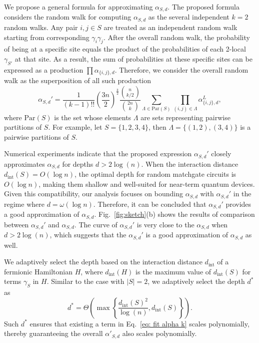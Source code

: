 \documentclass[showpacs,onecolumn,aps,prx,long bibliography,superscriptaddress,notitlepage]{revtex4-1}
\begin{document}
We propose a general formula for approximating $ \alpha_{S,d} $. The proposed formula considers the random walk for computing  $ \alpha_{S,d}$  as the several independent $k=2$ random walks. 
Any pair $i,j\in S$  are treated as an independent random walk starting from {corresponding} $\gamma_i\gamma_j$. 
After the overall random walk, the probability of being at a specific site equals the product of the probabilities of each 2-local $ \gamma_{S'} $ at that site. As a result, the sum of probabilities at these specific sites can be expressed as a production $\prod\alpha_{\{i,j\},d}$. 
Therefore, we consider the overall random walk as the superposition of all such production
\begin{equation}
    \alpha_{S,d}' = \frac{1}{(k-1)!!} \left(\frac{3n}{2}\right)^\frac{k}{2} \frac{\binom{n}{k/2}}{\binom{2n}{k}}\sum_{\Lambda\in\mathrm{Par}(S)} \prod_{(i,j)\in \Lambda}\alpha_{\{i,j\},d}^L,
    \label{eq: fit alpha k}
\end{equation}
where $\mathrm{Par}(S)$ is the set whose elements $\Lambda$ are sets representing pairwise partitions of $S$. For example, let $S = \{1,2,3,4\}$, then $\Lambda = \{(1,2), (3,4)\}$ is a pairwise partitions of $S$. 


Numerical experiments indicate that the proposed expression $ \alpha_{S,d}' $ closely approximates $ \alpha_{S,d} $ for depths $d > 2\log(n)$. When the interaction distance $d_\text{int}(S)=O(\log n)$, the optimal depth for random matchgate circuits is $O(\log n)$, making them shallow and well-suited for near-term quantum devices. Given this compatibility, our analysis focuses on bounding $\alpha_{S,d}$ with $ \alpha_{S,d}' $ in the regime where $d = \omega(\log n)$.
Therefore, it can be concluded that $ \alpha_{S,d}' $ provides a good approximation of $ \alpha_{S,d} $. Fig.~\ref{fig:sketch}(b) shows the results of comparison between $\alpha_{S,d}'$ and $\alpha_{S,d}$.
The curve of $\alpha_{S,d}'$ is very close to the $\alpha_{S,d}$ when $d> 2\log(n)$, which suggests that the $\alpha_{S,d}'$ is a good approximation of $\alpha_{S,d}$ as well. 



We adaptively select the depth based on the interaction distance $ d_{\text{int}} $ of a fermionic Hamiltonian $H$, where $d_{\text{int}}(H)$ is the maximum value of $d_{\text{int}}(S)$ for terms $\gamma_S$ in $H$. Similar to the case with $|S|=2$, we adaptively select the depth $d^\ast$ as 
\begin{equation}
    d^\ast = \Theta\left(\max\left\{ \frac{d_{\text{int}}(S)^2}{\log(n)} , d_{\text{int}}(S)\right\}\right).
    \label{eq: adaptive depth}
\end{equation}
Such $ d^\ast $ ensures that {existing} a term in Eq.~\eqref{eq: fit alpha k} scales polynomially, thereby guaranteeing the overall $\alpha'_{S,d}$ also scales polynomially. 
\end{document}
